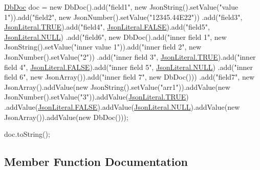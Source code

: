 \begin{DoxyPre}
\mbox{\hyperlink{interfacecom_1_1mysql_1_1cj_1_1xdevapi_1_1_db_doc}{DbDoc}} doc = new DbDoc().add("field1", new JsonString().setValue("value 1")).add("field2", new JsonNumber().setValue("12345.44E22"))
        .add("field3", \mbox{\hyperlink{enumcom_1_1mysql_1_1cj_1_1xdevapi_1_1_json_literal_a722be7500d3b4eaca0cff79a1d09b547}{JsonLiteral.TRUE}}).add("field4", \mbox{\hyperlink{enumcom_1_1mysql_1_1cj_1_1xdevapi_1_1_json_literal_a916ec267d9278e15e933d8e9c63b7c00}{JsonLiteral.FALSE}}).add("field5", \mbox{\hyperlink{enumcom_1_1mysql_1_1cj_1_1xdevapi_1_1_json_literal_ac7dcd6501113b4b9941a96fb4d91ae2c}{JsonLiteral.NULL}})
        .add("field6",
                new DbDoc().add("inner field 1", new JsonString().setValue("inner value 1")).add("inner field 2", new JsonNumber().setValue("2"))
                        .add("inner field 3", \mbox{\hyperlink{enumcom_1_1mysql_1_1cj_1_1xdevapi_1_1_json_literal_a722be7500d3b4eaca0cff79a1d09b547}{JsonLiteral.TRUE}}).add("inner field 4", \mbox{\hyperlink{enumcom_1_1mysql_1_1cj_1_1xdevapi_1_1_json_literal_a916ec267d9278e15e933d8e9c63b7c00}{JsonLiteral.FALSE}}).add("inner field 5", \mbox{\hyperlink{enumcom_1_1mysql_1_1cj_1_1xdevapi_1_1_json_literal_ac7dcd6501113b4b9941a96fb4d91ae2c}{JsonLiteral.NULL}})
                        .add("inner field 6", new JsonArray()).add("inner field 7", new DbDoc()))
        .add("field7", new JsonArray().addValue(new JsonString().setValue("arr1")).addValue(new JsonNumber().setValue("3")).addValue(\mbox{\hyperlink{enumcom_1_1mysql_1_1cj_1_1xdevapi_1_1_json_literal_a722be7500d3b4eaca0cff79a1d09b547}{JsonLiteral.TRUE}})
                .addValue(\mbox{\hyperlink{enumcom_1_1mysql_1_1cj_1_1xdevapi_1_1_json_literal_a916ec267d9278e15e933d8e9c63b7c00}{JsonLiteral.FALSE}}).addValue(\mbox{\hyperlink{enumcom_1_1mysql_1_1cj_1_1xdevapi_1_1_json_literal_ac7dcd6501113b4b9941a96fb4d91ae2c}{JsonLiteral.NULL}}).addValue(new JsonArray()).addValue(new DbDoc()));\end{DoxyPre}



\begin{DoxyPre}doc.toString();
\end{DoxyPre}
 

\subsection{Member Function Documentation}
\mbox{\label{classcom_1_1mysql_1_1cj_1_1xdevapi_1_1_db_doc_impl_afc266a49bb4249ce1a52ce6e69c7daea}} 

